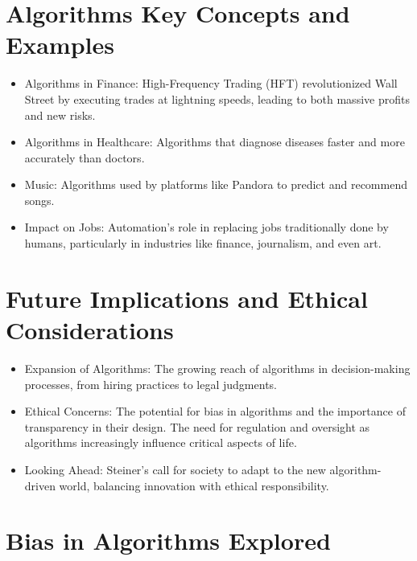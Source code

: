 \documentclass[
  letterpaper,
  DIV=11,
  numbers=noendperiod]{scrreprt}
\providecommand{\tightlist}{%
  \setlength{\itemsep}{0pt}\setlength{\parskip}{0pt}}\usepackage{longtable,booktabs,array}
\begin{document}
\section{Algorithms Key Concepts and
Examples}\label{algorithms-key-concepts-and-examples}

\begin{itemize}
\tightlist
\item
  Algorithms in Finance: High-Frequency Trading (HFT) revolutionized
  Wall Street by executing trades at lightning speeds, leading to both
  massive profits and new risks.
\item
  Algorithms in Healthcare: Algorithms that diagnose diseases faster and
  more accurately than doctors.
\item
  Music: Algorithms used by platforms like Pandora to predict and
  recommend songs.
\item
  Impact on Jobs: Automation's role in replacing jobs traditionally done
  by humans, particularly in industries like finance, journalism, and
  even art.
\end{itemize}

\section{Future Implications and Ethical
Considerations}\label{future-implications-and-ethical-considerations}

\begin{itemize}
\tightlist
\item
  Expansion of Algorithms: The growing reach of algorithms in
  decision-making processes, from hiring practices to legal judgments.
\item
  Ethical Concerns: The potential for bias in algorithms and the
  importance of transparency in their design. The need for regulation
  and oversight as algorithms increasingly influence critical aspects of
  life.
\item
  Looking Ahead: Steiner's call for society to adapt to the new
  algorithm-driven world, balancing innovation with ethical
  responsibility.
\end{itemize}

\section{Bias in Algorithms Explored}\label{bias-in-algorithms-explored}
\end{document}
